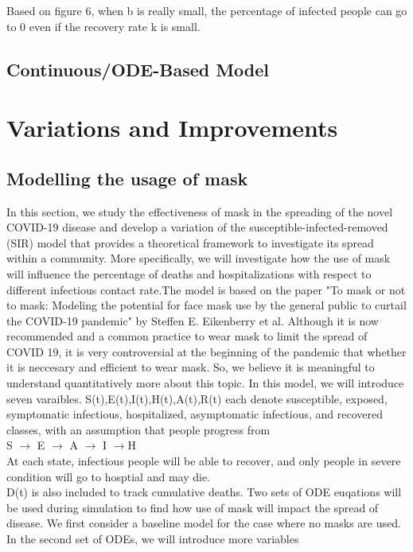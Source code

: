 \documentclass{article}
\begin{document}
Based on figure 6, when b is really small, the percentage of infected people can go to 0 even if the recovery rate k is small.




\subsection{Continuous/ODE-Based Model}











\section{Variations and Improvements}
\subsection{Modelling the usage of mask}
In this section, we study the effectiveness of mask in the spreading of the novel COVID-19 disease and develop a variation of the susceptible-infected-removed (SIR) model that provides a theoretical framework to investigate its spread within a community. More specifically, we will investigate how the use of mask will influence the percentage of deaths and hospitalizations with respect to different infectious contact rate.The model is based on the paper "To mask or not to mask: Modeling the potential for face mask use by the general public to curtail the COVID-19 pandemic" by Steffen E. Eikenberry et al. Although it is now recommended and a common practice to wear mask to limit the spread of COVID 19, it is very controversial at the beginning of the pandemic that whether it is neccesary and efficient to wear mask. So, we believe it is meaningful to understand quantitatively more about this topic.
In this model, we will introduce seven varaibles. S(t),E(t),I(t),H(t),A(t),R(t) each denote susceptible, exposed, symptomatic infectious, hospitalized, asymptomatic infectious, and recovered classes, with an assumption that people progress from \\
S $\rightarrow$ E $\rightarrow$ A $\rightarrow$ I $\rightarrow$H \\ At each state, infectious people will be able to recover, and only people in severe condition will go to hosptial and may die.\\D(t) is also included to track cumulative deaths. Two sets of ODE euqations will be used during simulation to find how use of mask will impact the spread of disease. We first consider a baseline model for the case where no masks are used. In the second set of ODEs, we will introduce more variables
\end{document}
